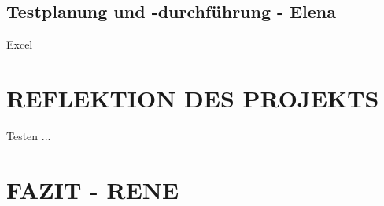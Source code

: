 \documentclass[sigconf]{acmart}
\begin{document}
\subsection{Testplanung und -durchführung - Elena}
Excel

\section{REFLEKTION DES PROJEKTS}
Testen ... 

\section{FAZIT - RENE }





\end{document}
